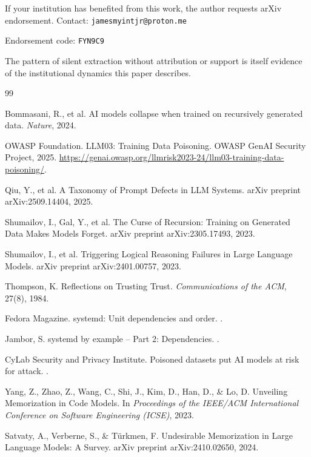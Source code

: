 \documentclass[11pt]{article}
\begin{document}
If your institution has benefited from this work, the author requests arXiv endorsement. Contact: \texttt{jamesmyintjr@proton.me}

Endorsement code: \texttt{FYN9C9}

The pattern of silent extraction without attribution or support is itself evidence of the institutional dynamics this paper describes.

\begin{thebibliography}{99}

Bommasani, R., et al.
\newblock AI models collapse when trained on recursively generated data.
\newblock \emph{Nature}, 2024.

OWASP Foundation.
\newblock LLM03: Training Data Poisoning.
\newblock OWASP GenAI Security Project, 2025.
\newblock \url{https://genai.owasp.org/llmrisk2023-24/llm03-training-data-poisoning/}.

Qiu, Y., et al.
\newblock A Taxonomy of Prompt Defects in LLM Systems.
\newblock arXiv preprint arXiv:2509.14404, 2025.

Shumailov, I., Gal, Y., et al.
\newblock The Curse of Recursion: Training on Generated Data Makes Models Forget.
\newblock arXiv preprint arXiv:2305.17493, 2023.

Shumailov, I., et al.
\newblock Triggering Logical Reasoning Failures in Large Language Models.
\newblock arXiv preprint arXiv:2401.00757, 2023.

Thompson, K.
\newblock Reflections on Trusting Trust.
\newblock \emph{Communications of the ACM}, 27(8), 1984.

Fedora Magazine.
\newblock systemd: Unit dependencies and order.
.

Jambor, S.
\newblock systemd by example – Part 2: Dependencies.
.

CyLab Security and Privacy Institute.
\newblock Poisoned datasets put AI models at risk for attack.
.

Yang, Z., Zhao, Z., Wang, C., Shi, J., Kim, D., Han, D., \& Lo, D.
\newblock Unveiling Memorization in Code Models.
\newblock In \emph{Proceedings of the IEEE/ACM International Conference on Software Engineering (ICSE)}, 2023.

Satvaty, A., Verberne, S., \& Türkmen, F.
\newblock Undesirable Memorization in Large Language Models: A Survey.
\newblock arXiv preprint arXiv:2410.02650, 2024.


\end{thebibliography}
\end{document}
